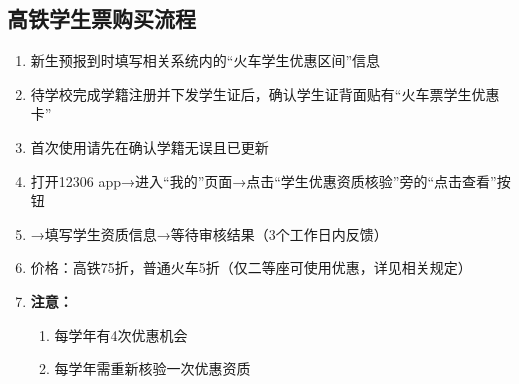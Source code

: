 \subsection[高铁学生票购买流程]{高铁学生票\footnotemark 购买流程}
\begin{enumerate}
    \item 新生预报到时填写相关系统内的“火车学生优惠区间”信息\footnotemark
    \item 待学校完成学籍注册并下发学生证后，确认学生证背面贴有“火车票学生优惠卡”\footnotemark
    \item 首次使用请先在确认学籍无误且已更新
    \item 打开12306 app→进入“我的”页面→点击“学生优惠资质核验”旁的“点击查看”按钮
    \item →填写学生资质信息→等待审核结果（3个工作日内反馈）
    \item 价格：高铁75折，普通火车5折（仅二等座可使用优惠，详见相关规定）
    \item \textbf{注意：}
          \begin{enumerate}
              \item 每学年\footnotemark 有4次优惠机会
              \item 每学年需重新核验\footnotemark 一次优惠资质
          \end{enumerate}
\end{enumerate}

